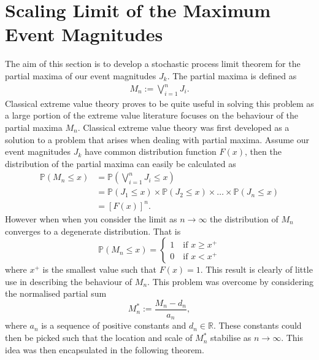 \documentclass[honours,12pt,twoside, openright]{unswthesis}
\newcommand{\R}{\mathbb{R}}
\newcommand{\PP}{\mathbb{P}}
\newcommand{\1}{\mathbf 1}
\numberwithin{equation}{section}
\theoremstyle{definition}
\theoremstyle{remark}
\begin{document}
\section{Scaling Limit of the Maximum Event Magnitudes}\label{s:max}
The aim of this section is to develop a stochastic process limit theorem for the partial maxima of our event magnitudes $J_k$. The partial maxima is defined as 
\begin{align}
	M_n:=\bigvee_{i=1}^n J_i.
\end{align}
Classical extreme value theory proves to be quite useful in solving this problem as a large portion of the extreme value literature focuses on the behaviour of the partial maxima $M_n$. Classical extreme value theory was first developed as a solution to a problem that arises when dealing with partial maxima. Assume our event magnitudes $J_k$ have common distribution function $F(x)$, then the distribution of the partial maxima can easily be calculated as
\begin{align*}
\PP(M_n\leq x)&=\PP\left(\bigvee_{i=1}^n J_i\leq x\right)\\
			  &=\PP(J_1\leq x)\times\PP(J_2\leq x)\times\ldots\times\PP(J_n\leq x)\\
			  &=[F(x)]^n.
\end{align*}
However when when you consider the limit as $n\to\infty$ the distribution of $M_n$ converges to a degenerate distribution. That is 
\[
	\PP(M_n\leq x)=\begin{cases} 1 \quad \textrm{if $x\geq x^+$}\\
								  0 \quad \textrm{if $x < x^+$}					
					\end{cases}
\]
where $x^+$ is the smallest value such that $F(x)=1$. This result is clearly of little use in describing the behaviour of $M_n$. This problem was overcome by considering the normalised partial sum 
\[
	M^*_n:=\frac{M_n-d_n}{a_n},
\]
where $a_n$ is a sequence of positive constants and $d_n\in\R$. These constants could then be picked such that the location and scale of $M^*_n$ stabilise as $n\to\infty$. This idea was then encapsulated in the following theorem.\\
\end{document}
